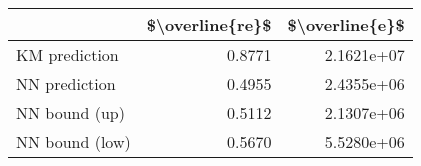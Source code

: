\begin{tabular}{lrr}
\toprule
{} &  \$\textbackslash overline\{re\}\$ &  \$\textbackslash overline\{e\}\$ \\
\midrule
KM prediction  &           0.8771 &      2.1621e+07 \\
NN prediction  &           0.4955 &      2.4355e+06 \\
NN bound (up)  &           0.5112 &      2.1307e+06 \\
NN bound (low) &           0.5670 &      5.5280e+06 \\
\bottomrule
\end{tabular}
